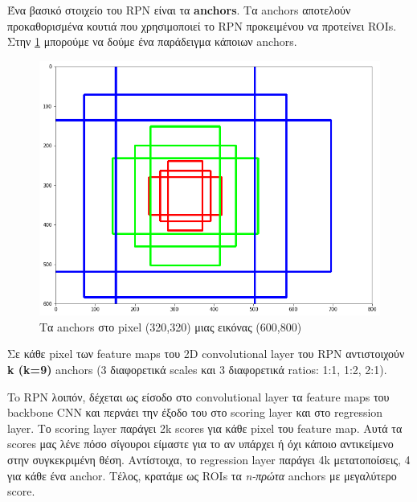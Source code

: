 \gr Ένα βασικό στοιχείο του \en RPN \gr είναι τα \en \textbf{anchors}. \gr Τα \en anchors \gr αποτελούν προκαθορισμένα κουτιά που χρησιμοποιεί
το \en RPN \gr προκειμένου να προτείνει \en ROIs. \gr Στην \ref{fig:anchors} μπορούμε να δούμε ένα παράδειγμα κάποιων \en anchors. 
\gr
\begin{figure}[h]
  \centering
  \includegraphics[scale=0.3]{./figures/anchors}
  \caption{\gr Τα \en anchors \gr στο \en pixel (320,320) \gr μιας εικόνας (600,800) }
  \label{fig:anchors}
\end{figure}
\gr Σε κάθε \en pixel \gr των \en feature maps  \gr του \en 2D convolutional layer \gr του \en RPN \gr αντιστοιχούν \en \textbf{k (k=9)} anchors
\gr (3 διαφορετικά \en scales \gr και 3 διαφορετικά \en ratios:  1:1, 1:2, 2:1). \par
\gr To \en RPN \gr λοιπόν, δέχεται ως είσοδο στο \en convolutional layer \gr τα \en feature maps \gr του \en backbone CNN \gr και περνάει την έξοδο του
στο \en scoring layer \gr και στο \en regression layer. 
\gr Tο \en scoring layer \gr παράγει \en 2k scores \gr για κάθε \en pixel \gr του \en feature map. \gr
\gr Αυτά τα \en scores \gr μας λένε πόσο σίγουροι είμαστε για το αν υπάρχει ή όχι κάποιο αντικείμενο στην συγκεκριμένη θέση. Αντίστοιχα, το \en regression
layer \gr παράγει \en 4k \gr μετατοποίσεις, 4 για κάθε ένα \en anchor. \gr Tέλος, κρατάμε ως \en ROIs \gr τα \textit{\en n-\gr πρώτα} \en anchors \gr
με μεγαλύτερο \en score.
